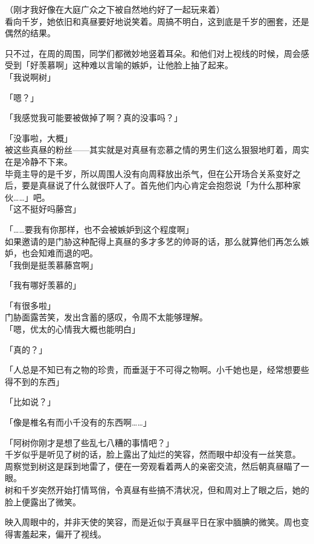 （刚才我好像在大庭广众之下被自然地约好了一起玩来着）\\

看向千岁，她依旧和真昼要好地说笑着。周搞不明白，这到底是千岁的圈套，还是偶然的结果。

只不过，在周的周围，同学们都微妙地竖着耳朵。和他们对上视线的时候，周会感受到「好羡慕啊」这种难以言喻的嫉妒，让他脸上抽了起来。\\

「我说啊树」

「嗯？」

「我感觉我可能要被做掉了啊？真的没事吗？」

「没事啦，大概」\\

被这些真昼的粉丝——其实就是对真昼有恋慕之情的男生们这么狠狠地盯着，周实在是冷静不下来。\\

毕竟主导的是千岁，所以周围人没有向周释放出杀气，但在公开场合关系变好之后，要是真昼说了什么就很吓人了。首先他们内心肯定会抱怨说「为什么那种家伙……」吧。\\

「这不挺好吗藤宫」

「……要我有你那样，也不会被嫉妒到这个程度啊」\\

如果邀请的是门胁这种配得上真昼的多才多艺的帅哥的话，那么就算他们再怎么嫉妒，也会知难而退的吧。\\

「我倒是挺羡慕藤宫啊」

「我有哪好羡慕的」

「有很多啦」\\

门胁面露苦笑，发出含蓄的感叹，令周不太能够理解。\\

「嗯，优太的心情我大概也能明白」

「真的？」

「人总是不知已有之物的珍贵，而垂涎于不可得之物啊。小千她也是，经常想要些得不到的东西」

「比如说？」

「像是椎名有而小千没有的东西啊……」

「阿树你刚才是想了些乱七八糟的事情吧？」\\

千岁似乎是听见了树的话，脸上露出了灿烂的笑容，然而眼中却没有一丝笑意。\\

周察觉到树这是踩到地雷了，便在一旁观看着两人的亲密交流，然后朝真昼瞄了一眼。\\

树和千岁突然开始打情骂俏，令真昼有些搞不清状况，但和周对上了眼之后，她的脸上便露出了微笑。

映入周眼中的，并非天使的笑容，而是近似于真昼平日在家中腼腆的微笑。周也变得害羞起来，偏开了视线。
